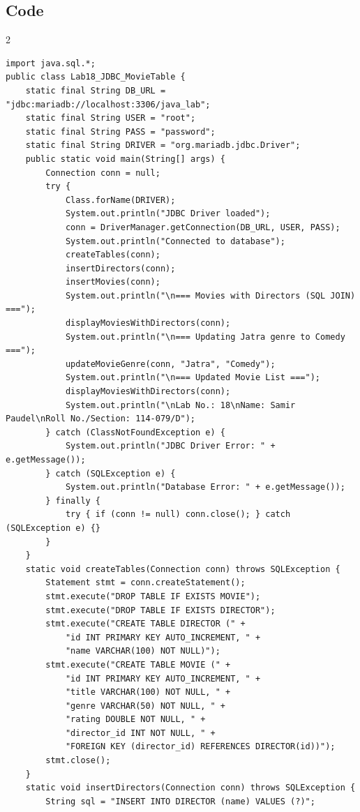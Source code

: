 \documentclass[10pt,a4paper]{article}
\begin{document}
\subsection*{Code}
\begin{multicols}{2}
\begin{lstlisting}
import java.sql.*;
public class Lab18_JDBC_MovieTable {
    static final String DB_URL = "jdbc:mariadb://localhost:3306/java_lab";
    static final String USER = "root";
    static final String PASS = "password";
    static final String DRIVER = "org.mariadb.jdbc.Driver";
    public static void main(String[] args) {
        Connection conn = null;
        try {
            Class.forName(DRIVER);
            System.out.println("JDBC Driver loaded");
            conn = DriverManager.getConnection(DB_URL, USER, PASS);
            System.out.println("Connected to database");
            createTables(conn);
            insertDirectors(conn);
            insertMovies(conn);
            System.out.println("\n=== Movies with Directors (SQL JOIN) ===");
            displayMoviesWithDirectors(conn);
            System.out.println("\n=== Updating Jatra genre to Comedy ===");
            updateMovieGenre(conn, "Jatra", "Comedy");
            System.out.println("\n=== Updated Movie List ===");
            displayMoviesWithDirectors(conn);
            System.out.println("\nLab No.: 18\nName: Samir Paudel\nRoll No./Section: 114-079/D");
        } catch (ClassNotFoundException e) {
            System.out.println("JDBC Driver Error: " + e.getMessage());
        } catch (SQLException e) {
            System.out.println("Database Error: " + e.getMessage());
        } finally {
            try { if (conn != null) conn.close(); } catch (SQLException e) {}
        }
    }
    static void createTables(Connection conn) throws SQLException {
        Statement stmt = conn.createStatement();
        stmt.execute("DROP TABLE IF EXISTS MOVIE");
        stmt.execute("DROP TABLE IF EXISTS DIRECTOR");
        stmt.execute("CREATE TABLE DIRECTOR (" +
            "id INT PRIMARY KEY AUTO_INCREMENT, " +
            "name VARCHAR(100) NOT NULL)");
        stmt.execute("CREATE TABLE MOVIE (" +
            "id INT PRIMARY KEY AUTO_INCREMENT, " +
            "title VARCHAR(100) NOT NULL, " +
            "genre VARCHAR(50) NOT NULL, " +
            "rating DOUBLE NOT NULL, " +
            "director_id INT NOT NULL, " +
            "FOREIGN KEY (director_id) REFERENCES DIRECTOR(id))");
        stmt.close();
    }
    static void insertDirectors(Connection conn) throws SQLException {
        String sql = "INSERT INTO DIRECTOR (name) VALUES (?)";

\end{lstlisting}
\end{multicols}
\end{document}

